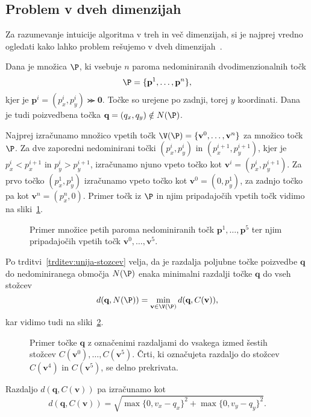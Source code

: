 \subsection{Problem v dveh dimenzijah} 
\label{sec:problem_2d}
Za razumevanje intuicije algoritma v treh in več dimenzijah, si je najprej vredno ogledati kako lahko problem rešujemo v dveh dimenzijah~\cite{moarchiving}.

Dana je množica  $\P$, ki vsebuje $n$ paroma nedominiranih dvodimenzionalnih točk 
\[
\P = \{\textbf{p}^1, \dots, \textbf{p}^n\},
\]
kjer je $\textbf{p}^i = (p^i_x, p^i_y) \ggcurly \textbf{0}$. Točke so urejene po zadnji, torej $y$ koordinati. Dana je tudi poizvedbena točka $\textbf{q} = (q_x, q_y) \notin N(\P)$.

Najprej izračunamo množico vpetih točk $\V(\P) = \{\textbf{v}^0, \dots, \textbf{v}^n\}$ za množico točk $\P$. Za dve zaporedni nedominirani točki $(p^i_x, p^i_y)$ in $(p^{i+1}_x, p^{i+1}_y)$, kjer je $p^i_x < p^{i+1}_x$ in $p^i_y > p^{i+1}_y$, izračunamo njuno vpeto točko kot $\textbf{v}^i = (p^i_x, p^{i+1}_y)$. Za prvo točko $(p^1_x, p^1_y)$ izračunamo vpeto točko kot $\textbf{v}^0 = (0, p^1_y)$, za zadnjo točko pa kot $\textbf{v}^n = (p^n_x, 0)$. Primer točk iz $\P$ in njim pripadajočih vpetih točk vidimo na sliki~\ref{fig:kink_points}.
\begin{figure}[ht]
  \centering
  
  \caption{Primer množice petih paroma nedominiranih točk $\textbf{p}^1, \dots, \textbf{p}^5$ ter njim pripadajočih vpetih točk $\textbf{v}^0, \dots, \textbf{v}^5$.}
  \label{fig:kink_points}
\end{figure}

Po trditvi~\ref{trditev:unija-stozcev} velja, da je razdalja poljubne točke poizvedbe $\textbf{q}$ do nedominiranega območja $N(\P)$ enaka minimalni razdalji točke $\textbf{q}$ do vseh stožcev
\[
d(\textbf{q}, N(\P)) = \min_{\textbf{v} \in \V(\P)} d(\textbf{q}, C(\textbf{v})),
\]
kar vidimo tudi na sliki~\ref{fig:cone_dist}.
\begin{figure}[ht]
  \centering
  
  \caption{Primer točke $\textbf{q}$ z označenimi razdaljami do vsakega izmed šestih stožcev $C(\textbf{v}^0), \dots, C(\textbf{v}^5)$. Črti, ki označujeta razdaljo do stožcev $C(\textbf{v}^4)$ in $C(\textbf{v}^5)$, se delno prekrivata.}
  \label{fig:cone_dist}
\end{figure}

Razdaljo $d(\textbf{q}, C(\textbf{v}))$ pa izračunamo kot
\[
d(\textbf{q}, C(\textbf{v})) = \sqrt{\max \{0, v_x - q_x\}^2 + \max \{0, v_y - q_y\}^2}. 
\]

